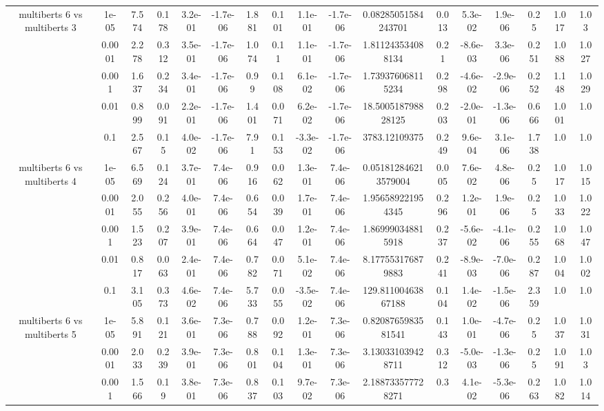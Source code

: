 \begin{tabular}{|c|c|c|c|c|c|c|c|c|c|c|c|c|c|c|c|c|}
\hline
\multirow{5}{*}{multiberts 6 vs multiberts 3} & 1e-05 & 7.574 & 0.178 & 3.2e-01 & -1.7e-06 & 1.881 & 0.101 & 1.1e-01 & -1.7e-06 & 0.08285051584243701 & 0.013 & 5.3e-02 & 1.9e-06 & 0.25 & 1.017 & 1.03 \\
 & 0.0001 & 2.278 & 0.312 & 3.5e-01 & -1.7e-06 & 1.074 & 0.11 & 1.1e-01 & -1.7e-06 & 1.811243534088134 & 0.21 & -8.6e-03 & 3.3e-06 & 0.251 & 1.088 & 1.027 \\
 & 0.001 & 1.637 & 0.234 & 3.4e-01 & -1.7e-06 & 0.99 & 0.108 & 6.1e-02 & -1.7e-06 & 1.739376068115234 & 0.298 & -4.6e-02 & -2.9e-06 & 0.252 & 1.148 & 1.029 \\
 & 0.01 & 0.899 & 0.091 & 2.2e-01 & -1.7e-06 & 1.401 & 0.071 & 6.2e-02 & -1.7e-06 & 18.500518798828125 & 0.203 & -2.0e-01 & -1.3e-06 & 0.666 & 1.001 & 1.0 \\
 & 0.1 & 2.567 & 0.15 & 4.0e-02 & -1.7e-06 & 7.91 & 0.153 & -3.3e-02 & -1.7e-06 & 3783.12109375 & 0.249 & 9.6e-04 & 3.1e-06 & 1.738 & 1.0 & 1.0 \\
\hline
\multirow{5}{*}{multiberts 6 vs multiberts 4} & 1e-05 & 6.569 & 0.124 & 3.7e-01 & 7.4e-06 & 0.916 & 0.062 & 1.3e-01 & 7.4e-06 & 0.051812846213579004 & 0.005 & 7.6e-02 & 4.8e-06 & 0.25 & 1.017 & 1.015 \\
 & 0.0001 & 2.055 & 0.256 & 4.0e-01 & 7.4e-06 & 0.654 & 0.039 & 1.7e-01 & 7.4e-06 & 1.956589221954345 & 0.296 & 1.2e-01 & 1.9e-06 & 0.25 & 1.033 & 1.022 \\
 & 0.001 & 1.523 & 0.207 & 3.9e-01 & 7.4e-06 & 0.664 & 0.047 & 1.2e-01 & 7.4e-06 & 1.869990348815918 & 0.237 & -5.6e-02 & -4.1e-06 & 0.255 & 1.068 & 1.047 \\
 & 0.01 & 0.817 & 0.063 & 2.4e-01 & 7.4e-06 & 0.782 & 0.071 & 5.1e-02 & 7.4e-06 & 8.177553176879883 & 0.241 & -8.9e-03 & -7.0e-06 & 0.287 & 1.004 & 1.002 \\
 & 0.1 & 3.105 & 0.373 & 4.6e-02 & 7.4e-06 & 5.733 & 0.055 & -3.5e-02 & 7.4e-06 & 129.81100463867188 & 0.104 & 1.4e-02 & -1.5e-06 & 2.359 & 1.0 & 1.0 \\
\hline
\multirow{5}{*}{multiberts 6 vs multiberts 5} & 1e-05 & 5.891 & 0.121 & 3.6e-01 & 7.3e-06 & 0.788 & 0.092 & 1.2e-01 & 7.3e-06 & 0.8208765983581541 & 0.143 & 1.0e-01 & -4.7e-06 & 0.25 & 1.037 & 1.031 \\
 & 0.0001 & 2.033 & 0.239 & 3.9e-01 & 7.3e-06 & 0.801 & 0.104 & 1.3e-01 & 7.3e-06 & 3.130331039428711 & 0.312 & -5.0e-03 & -1.3e-06 & 0.25 & 1.091 & 1.03 \\
 & 0.001 & 1.566 & 0.19 & 3.8e-01 & 7.3e-06 & 0.837 & 0.103 & 9.7e-02 & 7.3e-06 & 2.188733577728271 & 0.3 & 4.1e-02 & -5.3e-06 & 0.263 & 1.082 & 1.014 \\

\end{tabular}
